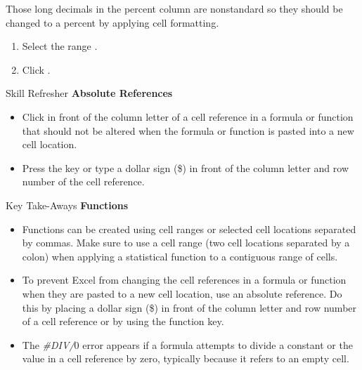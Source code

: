 Those long decimals in the percent column are nonstandard so they should be changed to a percent by applying cell formatting.

\begin{enumbox}
	\begin{enumerate}
		\item Select the range .
		\item Click .
	\end{enumerate}
\end{enumbox}

\begin{center}
	\begin{sklbox}{Skill Refresher}
		\textbf{Absolute References}
		\\
		\begin{itemize}
			\setlength{\itemsep}{0pt}
			\setlength{\parskip}{0pt}
			\setlength{\parsep}{0pt}

			\item Click in front of the column letter of a cell reference in a formula or function that should not be altered when the formula or function is pasted into a new cell location.
			\item Press the  key or type a dollar sign (\$) in front of the column letter and row number of the cell reference.
						
		\end{itemize}
	\end{sklbox}
\end{center}

\begin{center}
	\begin{tkwbox}{Key Take-Aways}
		\textbf{Functions}
		\\
		\begin{itemize}
			\setlength{\itemsep}{0pt}
			\setlength{\parskip}{0pt}
			\setlength{\parsep}{0pt}

			\item Functions can be created using cell ranges or selected cell locations separated by commas. Make sure to use a cell range (two cell locations separated by a colon) when applying a statistical function to a contiguous range of cells.
			\item To prevent Excel from changing the cell references in a formula or function when they are pasted to a new cell location, use an absolute reference. Do this by placing a dollar sign (\$) in front of the column letter and row number of a cell reference or by using the  function key.
			\item The \textit{\#DIV/$ 0 $} error appears if a formula attempts to divide a constant or the value in a cell reference by zero, typically because it refers to an empty cell.
			
		\end{itemize}
	\end{tkwbox}
\end{center}

